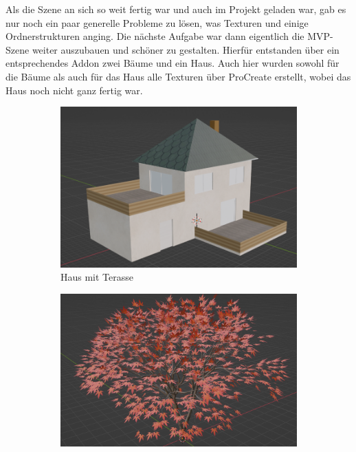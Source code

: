 Als die Szene an sich so weit fertig war und auch im Projekt geladen war, gab es nur noch ein paar generelle Probleme zu lösen, was Texturen und einige Ordnerstrukturen anging.
Die nächste Aufgabe war dann eigentlich die MVP-Szene weiter auszubauen und schöner zu gestalten. Hierfür entstanden über ein entsprechendes Addon zwei Bäume und ein Haus. Auch hier wurden sowohl für die Bäume als auch für das Haus alle Texturen über ProCreate erstellt, wobei das Haus noch nicht ganz fertig war.
\begin{figure}[H]
	
	\begin{subfigure}{0.5\textwidth}
		\includegraphics[height=0.3\pageheight,keepaspectratio]{pics/14} 
		\caption{Haus mit Terasse}
	\end{subfigure}	
	\begin{subfigure}{0.5\textwidth}
		\includegraphics[height=0.3\pageheight,keepaspectratio]{pics/15} 

\end{subfigure}
\end{figure}
